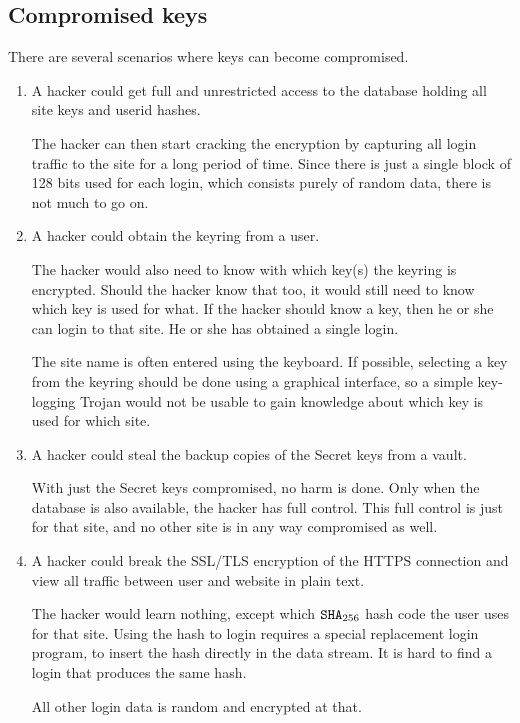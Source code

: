 \subsection{Compromised keys}
There are several scenarios where keys can become compromised.
\begin{enumerate}
\item A hacker could get full and unrestricted access to the database holding all site keys and userid hashes.
\par
The hacker can then start cracking the  encryption by capturing all
login traffic to the site for a long period of time.
Since there is just a single block of 128 bits used for each login,
which consists purely of random data,
there is not much to go on.
\item A hacker could obtain the keyring from a user.
\par
The hacker would also need to know with which key(s) the keyring is encrypted.
Should the hacker know that too, it would still need to know which key is used for what.
If the hacker should know a key, then he or she can login to that site.
He or she has obtained a single login.
\par
The site name is often entered using the keyboard.
If possible,
selecting a key from the keyring should be done using a graphical interface,
so a simple key-logging Trojan would not be usable to gain knowledge about which key is used for which site.
\item A hacker could steal the backup copies of the Secret keys from a vault.
\par
With just the Secret keys compromised, no harm is done.
Only when the database is also available, the hacker has full control.
This full control is just for that site, and no other site is in any way compromised as well.
\item A hacker could break the SSL/TLS encryption of the HTTPS connection and
view all traffic between user and website in plain text.
\par
The hacker would learn nothing, except which $\mathtt{SHA}_{256}$ hash code the user uses for that site.
Using the hash to login requires a special replacement login program, to insert the hash directly in the data stream.
It is hard to find a login that produces the same hash.
\par
All other login data is random and encrypted at that.
\end{enumerate}
